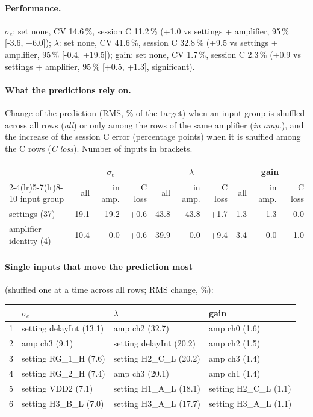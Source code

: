 \paragraph{Performance.}
$\sigma_e$: set none, CV 14.6\,\%, session C 11.2\,\% (+1.0 vs settings + amplifier, 95\,\% [-3.6, +6.0]); $\lambda$: set none, CV 41.6\,\%, session C 32.8\,\% (+9.5 vs settings + amplifier, 95\,\% [-0.4, +19.5]); gain: set none, CV 1.7\,\%, session C 2.3\,\% (+0.9 vs settings + amplifier, 95\,\% [+0.5, +1.3], significant).
\paragraph{What the predictions rely on.} Change of the prediction (RMS, \% of the target) when an input group is shuffled across all rows (\emph{all}) or only among the rows of the same amplifier (\emph{in amp.}), and the increase of the session C error (percentage points) when it is shuffled among the C rows (\emph{C loss}). Number of inputs in brackets.
\begin{center}\footnotesize
\begin{tabular}{lrrrrrrrrr}
\toprule
 & \multicolumn{3}{c}{$\sigma_e$} & \multicolumn{3}{c}{$\lambda$} & \multicolumn{3}{c}{gain} \\
\cmidrule(lr){2-4}\cmidrule(lr){5-7}\cmidrule(lr){8-10}
input group & all & in amp. & C loss & all & in amp. & C loss & all & in amp. & C loss \\
\midrule
settings (37) & 19.1 & 19.2 & +0.6 & 43.8 & 43.8 & +1.7 & 1.3 & 1.3 & +0.0 \\
amplifier identity (4) & 10.4 & 0.0 & +0.6 & 39.9 & 0.0 & +9.4 & 3.4 & 0.0 & +1.0 \\
\bottomrule
\end{tabular}
\end{center}
\paragraph{Single inputs that move the prediction most} (shuffled one at a time across all rows; RMS change, \%):
\begin{center}\footnotesize
\begin{tabular}{rp{}p{}p{}}
\toprule
 & $\sigma_e$ & $\lambda$ & gain \\
\midrule
1 & setting delayInt (13.1) & amp ch2 (32.7) & amp ch0 (1.6) \\
2 & amp ch3 (9.1) & setting delayInt (20.2) & amp ch2 (1.5) \\
3 & setting RG\_1\_H (7.6) & setting H2\_C\_L (20.2) & amp ch3 (1.4) \\
4 & setting RG\_2\_H (7.4) & amp ch3 (20.1) & amp ch1 (1.4) \\
5 & setting VDD2 (7.1) & setting H1\_A\_L (18.1) & setting H2\_C\_L (1.1) \\
6 & setting H3\_B\_L (7.0) & setting H3\_A\_L (17.7) & setting H3\_A\_L (1.1) \\
\bottomrule
\end{tabular}
\end{center}
